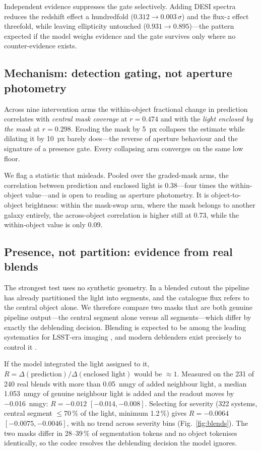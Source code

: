 \documentclass[11pt]{article}
\begin{document}
Independent evidence suppresses the gate selectively. Adding DESI spectra reduces the redshift
effect a hundredfold ($0.312\rightarrow0.003\,\sigma$) and the flux-$z$ effect threefold, while
leaving ellipticity untouched ($0.931\rightarrow0.895$)---the pattern expected if the model
weighs evidence and the gate survives only where no counter-evidence exists.

\subsection{Mechanism: detection gating, not aperture photometry}

Across nine intervention arms the within-object fractional change in prediction correlates with
\emph{central mask coverage} at $r=0.474$ and with the \emph{light enclosed by the mask} at
$r=0.298$. Eroding the mask by \SI{5}{px} collapses the estimate while dilating it by
\SI{10}{px} barely does---the reverse of aperture behaviour and the signature of a presence
gate. Every collapsing arm converges on the same low floor.

We flag a statistic that misleads. Pooled over the graded-mask arms, the correlation between
prediction and enclosed light is 0.38---four times the within-object value---and is open to
reading as aperture photometry. It is object-to-object brightness: within the mask-swap arm,
where the mask belongs to another galaxy entirely, the across-object correlation is higher still
at 0.73, while the within-object value is only 0.09.

\subsection{Presence, not partition: evidence from real blends}

The strongest test uses no synthetic geometry. In a blended cutout the pipeline has already
partitioned the light into segments, and the catalogue flux refers to the central object alone.
We therefore compare two masks that are both genuine pipeline output---the central segment alone
versus all segments---which differ by exactly the deblending decision. Blending is expected to be among the leading
systematics for LSST-era imaging \citep{melchior2021blending,sanchez2021blending},
and modern deblenders exist precisely to control it \citep{melchior2018scarlet}.

If the model integrated the light assigned to it, $R=\Delta(\text{prediction})/\Delta(\text{enclosed
light})$ would be $\approx1$. Measured on the 231 of 240 real blends with more than
\SI{0.05}{nmgy} of added neighbour light, a median \SI{1.053}{nmgy} of genuine
neighbour light is added and the readout moves by \SI{-0.016}{nmgy}: $R=-0.012$
$[-0.014,-0.008]$. Selecting for severity (322 systems, central segment $\le70\,\%$ of the
light, minimum 1.2\,\%) gives $R=-0.0064$ $[-0.0075,-0.0046]$, with no trend across severity
bins (Fig.~\ref{fig:blends}). The two masks differ in 28--39\,\% of segmentation tokens and no
object tokenises identically, so the codec resolves the deblending decision the model ignores.
\end{document}
